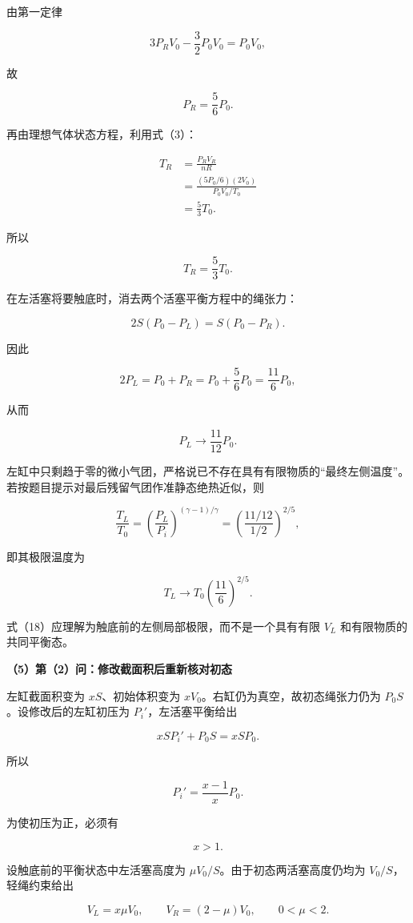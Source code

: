 \documentclass[12pt,a4paper,UTF8]{ctexart}
\begin{document}
由第一定律

\[
3P_RV_0-\frac32P_0V_0=P_0V_0,
\]

故

\[
\boxed{P_R=\frac56P_0}.
\tag{15}
\]

再由理想气体状态方程，利用式（3）：

\[
\begin{aligned}
T_R
&=\frac{P_RV_R}{nR}\\
&=\frac{(5P_0/6)(2V_0)}{P_0V_0/T_0}\\
&=\frac53T_0.
\end{aligned}
\]

所以

\[
\boxed{T_R=\frac53T_0}.
\tag{16}
\]

在左活塞将要触底时，消去两个活塞平衡方程中的绳张力：

\[
2S(P_0-P_L)=S(P_0-P_R).
\]

因此

\[
2P_L=P_0+P_R
=P_0+\frac56P_0
=\frac{11}{6}P_0,
\]

从而

\[
\boxed{P_L\to\frac{11}{12}P_0}.
\tag{17}
\]

左缸中只剩趋于零的微小气团，严格说已不存在具有有限物质的``最终左侧温度''。若按题目提示对最后残留气团作准静态绝热近似，则

\[
\frac{T_L}{T_0}
=\left(\frac{P_L}{P_i}\right)^{(\gamma-1)/\gamma}
=\left(\frac{11/12}{1/2}\right)^{2/5},
\]

即其极限温度为

\[
\boxed{T_L\to T_0\left(\frac{11}{6}\right)^{2/5}}.
\tag{18}
\]

式（18）应理解为触底前的左侧局部极限，而不是一个具有有限 \(V_L\)
和有限物质的共同平衡态。

\textbf{（5）第（2）问：修改截面积后重新核对初态}

左缸截面积变为 \(xS\)、初始体积变为
\(xV_0\)。右缸仍为真空，故初态绳张力仍为 \(P_0S\)。设修改后的左缸初压为
\(P_i'\)，左活塞平衡给出

\[
xSP_i'+P_0S=xSP_0.
\]

所以

\[
\boxed{P_i'=\frac{x-1}{x}P_0}.
\tag{19}
\]

为使初压为正，必须有

\[
x>1.
\tag{20}
\]

设触底前的平衡状态中左活塞高度为 \(\mu V_0/S\)。由于初态两活塞高度仍均为
\(V_0/S\)，轻绳约束给出

\[
V_L=x\mu V_0,
\qquad
V_R=(2-\mu)V_0,
\qquad 0<\mu<2.
\tag{21}
\]
\end{document}
